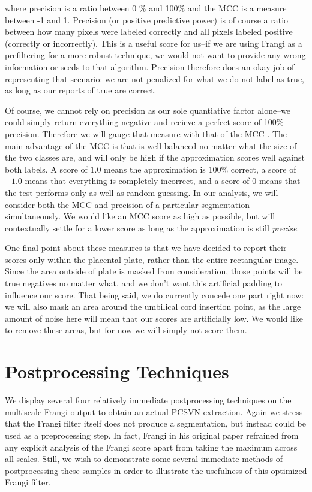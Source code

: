 where precision is a ratio between 0 \% and 100\% and the MCC is a measure between -1 and 1. Precision (or positive predictive power) is of course a ratio between how many pixels were labeled correctly and all pixels labeled positive (correctly or incorrectly). This is a useful score for us--if we are using Frangi as a prefiltering for a more robust technique, we would not want to provide any wrong information or seeds to that algorithm. Precision therefore does an okay job of representing that scenario: we are not penalized for what we do not label as true, as long as our reports of true are correct.

Of course, we cannot rely on precision as our sole quantiative factor alone--we could simply return everything negative and recieve a perfect score of 100\% precision. Therefore we will gauge that measure with that of the MCC \cite{mcc-original-paper}. The main advantage of the MCC is that is well balanced no matter what the size of the two classes are, and will only be high if the approximation scores well against both labels. A score of $1.0$ means the approximation is 100\% correct, a score of $-1.0$ means that everything is completely incorrect, and a score of $0$ means that the test performs only as well as random guessing. In our analysis, we will consider both the MCC and precision of a particular segmentation simultaneously. We would like an MCC score as high as possible, but will contextually settle for a lower score as long as the approximation is still \textit{precise}.

One final point about these measures is that we have decided to report their scores only within the placental plate, rather than the entire rectangular image. Since the area outside of plate is masked from consideration, those points will be true negatives no matter what, and we don't want this artificial padding to influence our score. That being said, we do currently concede one part right now: we will also mask an area around the umbilical cord insertion point, as the large amount of noise here will mean that our scores are artificially low. We would like to remove these areas, but for now we will simply not score them. 

\section{Postprocessing Techniques}
We display several four relatively immediate postprocessing techniques on the multiscale Frangi output to obtain an actual PCSVN extraction. Again we stress that the Frangi filter itself does not produce a segmentation, but instead could be used as a preprocessing step. In fact, Frangi in his original paper \cite{frangi-paper} refrained from any explicit analysis of the Frangi score apart from taking the maximum across all scales. Still, we wish to demonstrate some several immediate methods of postprocessing these samples in order to illustrate the usefulness of this optimized Frangi filter. 



